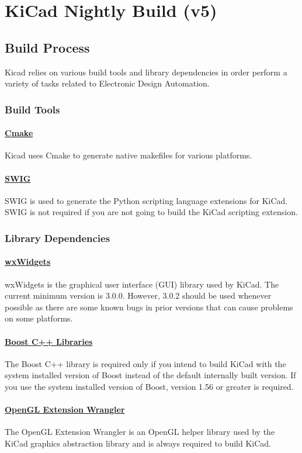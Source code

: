 \documentclass[12pt,a4paper]{report}
\begin{document}
\chapter{\textbf{KiCad Nightly Build (v5)}}
\section{Build Process}
Kicad relies on various build tools and library dependencies in order perform a variety of tasks related to Electronic Design Automation.
\subsection{Build Tools}
\subsubsection{\href{https://cmake.org/}{Cmake}}
Kicad uses Cmake to generate native makefiles for various platforms.
\subsubsection{\href{http://www.swig.org/}{SWIG}}
SWIG is used to generate the Python scripting language extensions for KiCad. SWIG is not required if you are not going to build the KiCad scripting extension.
\subsection{Library Dependencies}
\subsubsection{\href{https://www.wxwidgets.org/}{wxWidgets}}
wxWidgets is the graphical user interface (GUI) library used by KiCad. The current minimum version is 3.0.0. However, 3.0.2 should be used whenever possible as there are some known bugs in prior versions that can cause problems on some platforms.
\subsubsection{\href{http://www.boost.org/}{Boost C++ Libraries}}
The Boost C++ library is required only if you intend to build KiCad with the system installed version of Boost instead of the default internally built version. If you use the system installed version of Boost, version 1.56 or greater is required.
\subsubsection{\href{http://glew.sourceforge.net/}{OpenGL Extension Wrangler}}
The OpenGL Extension Wrangler is an OpenGL helper library used by the KiCad graphics abstraction library and is always required to build KiCad.
\end{document}
